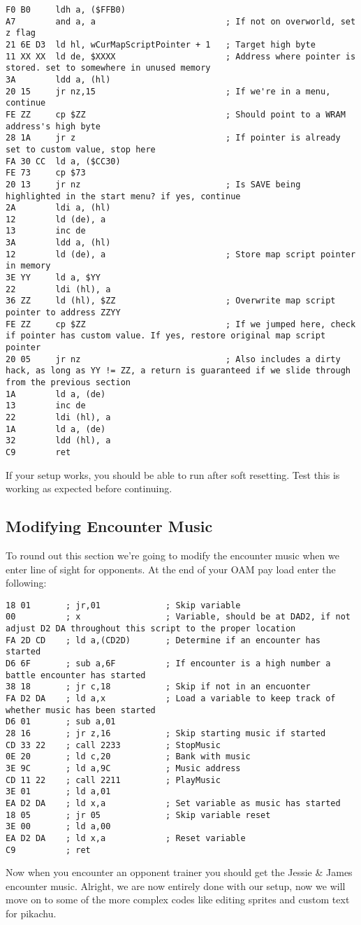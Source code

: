\documentclass[../main.tex]{subfiles}
\begin{document}
    \begin{verbatim}
F0 B0     ldh a, ($FFB0)
A7        and a, a                          ; If not on overworld, set z flag
21 6E D3  ld hl, wCurMapScriptPointer + 1   ; Target high byte
11 XX XX  ld de, $XXXX                      ; Address where pointer is stored. set to somewhere in unused memory
3A        ldd a, (hl)
20 15     jr nz,15                          ; If we're in a menu, continue
FE ZZ     cp $ZZ                            ; Should point to a WRAM address's high byte
28 1A     jr z                              ; If pointer is already set to custom value, stop here
FA 30 CC  ld a, ($CC30)
FE 73     cp $73
20 13     jr nz                             ; Is SAVE being highlighted in the start menu? if yes, continue
2A        ldi a, (hl)
12        ld (de), a
13        inc de
3A        ldd a, (hl)
12        ld (de), a                        ; Store map script pointer in memory
3E YY     ld a, $YY
22        ldi (hl), a
36 ZZ     ld (hl), $ZZ                      ; Overwrite map script pointer to address ZZYY
FE ZZ     cp $ZZ                            ; If we jumped here, check if pointer has custom value. If yes, restore original map script pointer
20 05     jr nz                             ; Also includes a dirty hack, as long as YY != ZZ, a return is guaranteed if we slide through from the previous section
1A        ld a, (de)
13        inc de
22        ldi (hl), a
1A        ld a, (de)
32        ldd (hl), a
C9        ret
    \end{verbatim}

    If your setup works, you should be able to run after soft resetting.  Test this is working as expected before continuing.

    \subsection{Modifying Encounter Music}
    To round out this section we're going to modify the encounter music when we enter line of sight for opponents.  At the end of your OAM pay load enter the following:

    \begin{verbatim}
18 01		; jr,01		        ; Skip variable
00		    ; x		            ; Variable, should be at DAD2, if not adjust D2 DA throughout this script to the proper location
FA 2D CD	; ld a,(CD2D)	    ; Determine if an encounter has started
D6 6F		; sub a,6F	        ; If encounter is a high number a battle encounter has started
38 18		; jr c,18		    ; Skip if not in an encuonter
FA D2 DA	; ld a,x		    ; Load a variable to keep track of whether music has been started
D6 01		; sub a,01
28 16		; jr z,16		    ; Skip starting music if started
CD 33 22	; call 2233	        ; StopMusic
0E 20		; ld c,20		    ; Bank with music
3E 9C		; ld a,9C		    ; Music address
CD 11 22	; call 2211	        ; PlayMusic
3E 01		; ld a,01
EA D2 DA	; ld x,a		    ; Set variable as music has started
18 05		; jr 05		        ; Skip variable reset
3E 00		; ld a,00
EA D2 DA	; ld x,a		    ; Reset variable
C9		    ; ret
    \end{verbatim}

    Now when you encounter an opponent trainer you should get the Jessie \& James encounter music.  Alright, we are now entirely done with our setup, now we will move on to some of the more complex codes like editing sprites and custom text for pikachu.
\end{document}
